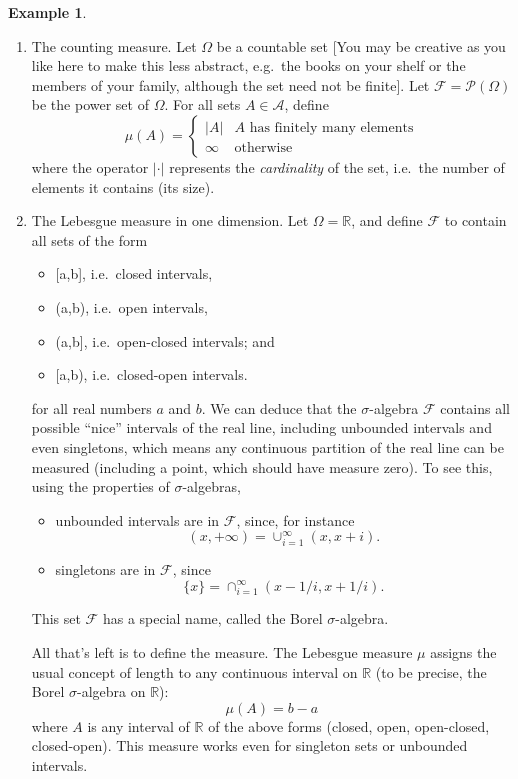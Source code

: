 \documentclass[
]{book}
\providecommand{\tightlist}{%
  \setlength{\itemsep}{0pt}\setlength{\parskip}{0pt}}
\newcommand{\bbR}{\mathbb{R}}
\newcommand{\cA}{{\mathcal A}}
\newcommand{\cF}{{\mathcal F}}
\newcommand{\cP}{{\mathcal P}}
\theoremstyle{definition}
\theoremstyle{definition}
\newtheorem{example}{Example}[chapter]
\theoremstyle{definition}
\theoremstyle{definition}
\theoremstyle{remark}
\begin{document}
\begin{example}

\begin{enumerate}
\def\labelenumi{\arabic{enumi}.}
\item
  The counting measure. Let \(\Omega\) be a countable set {[}You may be creative as you like here to make this less abstract, e.g.~the books on your shelf or the members of your family, although the set need not be finite{]}. Let \(\cF=\cP(\Omega)\) be the power set of \(\Omega\). For all sets \(A\in\cA\), define \[\mu(A) = \begin{cases} |A| & A \text{ has finitely many elements}\\ \infty &\text{otherwise} \end{cases}\] where the operator \(|\cdot|\) represents the \emph{cardinality} of the set, i.e.~the number of elements it contains (its size).
\item
  The Lebesgue measure in one dimension. Let \(\Omega=\bbR\), and define \(\cF\) to contain all sets of the form

  \begin{itemize}
  \tightlist
  \item
    {[}a,b{]}, i.e.~closed intervals,
  \item
    (a,b), i.e.~open intervals,
  \item
    (a,b{]}, i.e.~open-closed intervals; and
  \item
    {[}a,b), i.e.~closed-open intervals.
  \end{itemize}

  for all real numbers \(a\) and \(b\). We can deduce that the \(\sigma\)-algebra \(\cF\) contains all possible ``nice'' intervals of the real line, including unbounded intervals and even singletons, which means any continuous partition of the real line can be measured (including a point, which should have measure zero). To see this, using the properties of \(\sigma\)-algebras,

  \begin{itemize}
  \item
    unbounded intervals are in \(\cF\), since, for instance \[(x,+\infty)=\cup_{i=1}^\infty(x,x+i).\]
  \item
    singletons are in \(\cF\), since \[\{x\}=\cap_{i=1}^\infty (x-1/i,x+1/i).\]
  \end{itemize}

  This set \(\cF\) has a special name, called the Borel \(\sigma\)-algebra.

  All that's left is to define the measure. The Lebesgue measure \(\mu\) assigns the usual concept of length to any continuous interval on \(\bbR\) (to be precise, the Borel \(\sigma\)-algebra on \(\bbR\)): \[\mu\left(A\right)=b-a\]
  where \(A\) is any interval of \(\bbR\) of the above forms (closed, open, open-closed, closed-open). This measure works even for singleton sets or unbounded intervals.
\end{enumerate}

\end{example}
\end{document}
